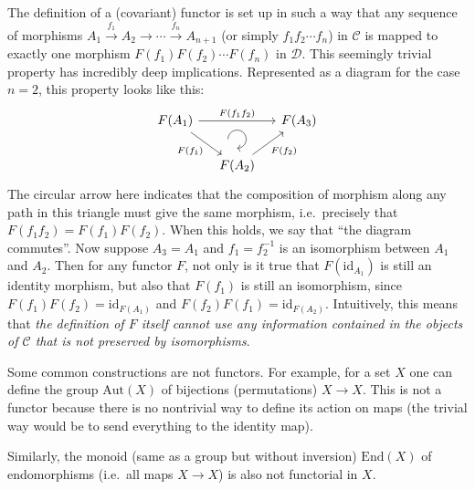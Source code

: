 The definition of a (covariant) functor is set up in such a way that any sequence of morphisms $A_1\overset{f_1}{\to}A_2\to\cdots\overset{f_n}\to A_{n+1}$ (or simply $f_1f_2\cdots f_n$) in $\mathcal{C}$ is mapped to exactly one morphism $F(f_1)F(f_2)\cdots F(f_n)$ in $\mathcal{D}$. This seemingly trivial property has incredibly deep implications. Represented as a diagram for the case $n=2$, this property looks like this:
\begin{equation}
\begin{tikzcd}[column sep=small, every matrix/.append style={name=m},   
execute at end picture={\draw [<-] ([xshift=0em,yshift=.5em]m-2-2.north) arc[start angle=-90,delta angle=270,radius=0.25cm];}]
F(A_1) \arrow[rr, "F(f_1f_2)"] \arrow[dr, "F(f_1)", swap] & & F(A_3)\\
& F(A_2)  \arrow[ru, "F(f_2)"'] & 
\end{tikzcd}
\end{equation}
The circular arrow here indicates that the composition of morphism along any path in this triangle must give the same morphism, i.e.\ precisely that $F(f_1f_2)=F(f_1)F(f_2)$. When this holds, we say that ``the diagram commutes''. Now suppose $A_3=A_1$ and $f_1=f_2^{-1}$ is an isomorphism between $A_1$ and $A_2$. Then for any functor $F$, not only is it true that $F(\mathrm{id}_{A_1})$ is still an identity morphism, but also that $F(f_1)$ is still an isomorphism, since $F(f_1)F(f_2)=\mathrm{id}_{F(A_1)}$ and $F(f_2)F(f_1)=\mathrm{id}_{F(A_2)}$. Intuitively, this means that \emph{the definition of $F$ itself cannot use any information contained in the objects of $\mathcal{C}$ that is not preserved by isomorphisms}. 

\begin{example}
    Some common constructions are not functors. For example, for a set $X$ one can define the group $\mathrm{Aut}(X)$ of bijections (permutations) $X\to X$. This is not a functor because there is no nontrivial way to define its action on maps (the trivial way would be to send everything to the identity map).

    Similarly, the monoid (same as a group but without inversion) $\mathrm{End}(X)$ of endomorphisms (i.e.\ all maps $X\to X$) is also not functorial in $X$.
\end{example}


